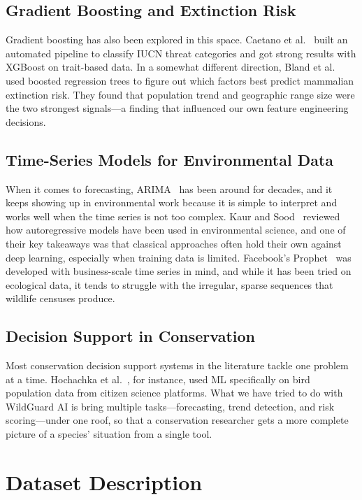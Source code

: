 \documentclass[conference]{IEEEtran}
\begin{document}
\subsection{Gradient Boosting and Extinction Risk}
Gradient boosting has also been explored in this space. Caetano et al.~\cite{caetano2022} built an automated pipeline to classify IUCN threat categories and got strong results with XGBoost on trait-based data. In a somewhat different direction, Bland et al.~\cite{bland2015} used boosted regression trees to figure out which factors best predict mammalian extinction risk. They found that population trend and geographic range size were the two strongest signals---a finding that influenced our own feature engineering decisions.

\subsection{Time-Series Models for Environmental Data}
When it comes to forecasting, ARIMA~\cite{box2015} has been around for decades, and it keeps showing up in environmental work because it is simple to interpret and works well when the time series is not too complex. Kaur and Sood~\cite{kaur2023} reviewed how autoregressive models have been used in environmental science, and one of their key takeaways was that classical approaches often hold their own against deep learning, especially when training data is limited. Facebook's Prophet~\cite{taylor2018} was developed with business-scale time series in mind, and while it has been tried on ecological data, it tends to struggle with the irregular, sparse sequences that wildlife censuses produce.

\subsection{Decision Support in Conservation}
Most conservation decision support systems in the literature tackle one problem at a time. Hochachka et al.~\cite{hochachka2007}, for instance, used ML specifically on bird population data from citizen science platforms. What we have tried to do with WildGuard AI is bring multiple tasks---forecasting, trend detection, and risk scoring---under one roof, so that a conservation researcher gets a more complete picture of a species' situation from a single tool.

\section{Dataset Description}
\end{document}

